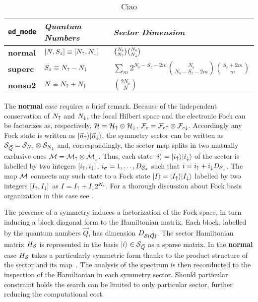 \documentclass[edipack2.tex]{subfiles}
\begin{document}
\begin{table}%
  \label{TabSector}
\begin{center}
\begin{tabularx}{\linewidth}{ |X|X|X| } 
 \hline
  {\tt ed\_mode} & {\it Quantum Numbers} & {\it Sector Dimension} \\
  \hline
  {\bf normal} & $[N,S_z]\equiv[N_\uparrow,N_\downarrow]$ &
                                                $\binom{N_\mathrm{s}}{N_\uparrow}\binom{N_\mathrm{s}}{N_\downarrow}$
  \\
  \hline
  {\bf superc} & $S_z\equiv N_\uparrow-N_\downarrow$ &  $\sum_m 2^{N_\mathrm{s}-S_z-2m}\binom{N_\mathrm{s}}{N_\mathrm{s}-S_z-2m}\binom{S_z+2m}{m}$
  \\
  \hline
  {\bf nonsu2} & $N \equiv N_\uparrow+N_\downarrow$ & $\binom{2N_\mathrm{s}}{N}$ \\ 
 \hline
\end{tabularx}
\end{center}
\caption{Ciao}
\end{table}


The {\bf normal} case requires a brief remark. Because of the
independent conservation of $N_\uparrow$ and $N_\downarrow$, the local Hilbert
space and the electronic Fock can be factorizes as, respectively,
${\cal H}={\cal H}_\uparrow\otimes{\cal H}_\downarrow$, ${\cal F}_\mathrm{e} = {\cal F}_{e\uparrow}\otimes {\cal F}_{e\downarrow}$.  
Accordingly any Fock state is written as $|\vec{n}_\uparrow\rangle|\vec{n}_\downarrow\rangle$, the symmetry sector can be written as  ${\cal S}_{\vec{Q}} = {\cal S}_{N_\uparrow}\otimes
{\cal S}_{N_\downarrow}$ and, correspondingly, the sector map splits in two
mutually exclusive ones ${\cal M} = {\cal M}_\uparrow
\otimes {\cal M}_\downarrow$.
Thus, each state $|i\rangle=|i_\uparrow\rangle|i_\downarrow\rangle$ of the
sector is labelled by two integers $[i_\uparrow,i_\downarrow]$, 
$i_\sigma=1,\dots,D_{{\cal S}_\sigma}$ such that $i=i_\uparrow + i_\downarrow
D_{{\cal S}_\downarrow}$. The map ${\cal M}$ connects any such state to a Fock state
$|I\rangle=|I_\uparrow\rangle|I_\downarrow\rangle$ labelled by two integers
$[I_\uparrow,I_\downarrow]$ as $I=I_\uparrow +   I_\downarrow 2^{N_\mathrm{s}}$. For a thorough
discussion about Fock basis organization in this case see
. 

The presence of a symmetry induces a factorization of the Fock space,
in turn inducing a block diagonal form to the Hamiltonian matrix.
Each block, labelled by the quantum numbers $\vec{Q}$, has dimension
$D_{{\cal S}(\vec{Q})}$. The sector Hamiltonian matrix $H_{\cal S}$ is represented in the
basis $|i\rangle\in{\cal S}_{\vec{Q}}$ as a sparse matrix. In the {\bf
  normal} case $H_{\cal S}$ takes a particularly symmetric form thanks to
the product structure of the sector and its map~\cite{Amaricci2022}.
The analysis of the spectrum is then reconducted to the inspection of
the Hamiltonian in each symmetry sector. Should particular constraint
holds the search can be limited to only particular sector, further
reducing the computational cost. 
\end{document}
